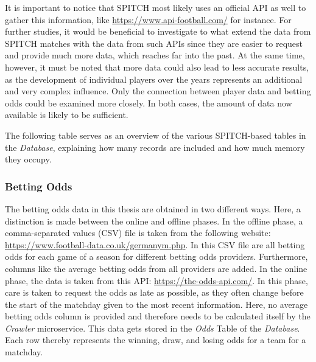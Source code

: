 It is important to notice that SPITCH most likely uses an official API as well to gather this information, like \underline{https://www.api-football.com/} for instance. For further studies, it would be beneficial to investigate to what extend the data from SPITCH matches with the data from such APIs since they are easier to request and provide much more data, which reaches far into the past. At the same time, however, it must be noted that more data could also lead to less accurate results, as the development of individual players over the years represents an additional and very complex influence. Only the connection between player data and betting odds could be examined more closely. In both cases, the amount of data now available is likely to be sufficient.

The following table serves as an overview of the various SPITCH-based tables in the \emph{Database}, explaining how many records are included and how much memory they occupy.

\subsubsection{Betting Odds}

The betting odds data in this thesis are obtained in two different ways. Here, a distinction is made between the online and offline phases. In the offline phase, a comma-separated values (CSV) file is taken from the following website: \\\underline{https://www.football-data.co.uk/germanym.php}. In this CSV file are all betting odds for each game of a season for different betting odds providers. Furthermore, columns like the average betting odds from all providers are added. In the online phase, the data is taken from this API: \underline{https://the-odds-api.com/}. In this phase, care is taken to request the odds as late as possible, as they often change before the start of the matchday given to the most recent information. Here, no average betting odds column is provided and therefore needs to be calculated itself by the \emph{Crawler} microservice. This data gets stored in the \emph{Odds} Table of the \emph{Database}. Each row thereby represents the winning, draw, and losing odds for a team for a matchday.

